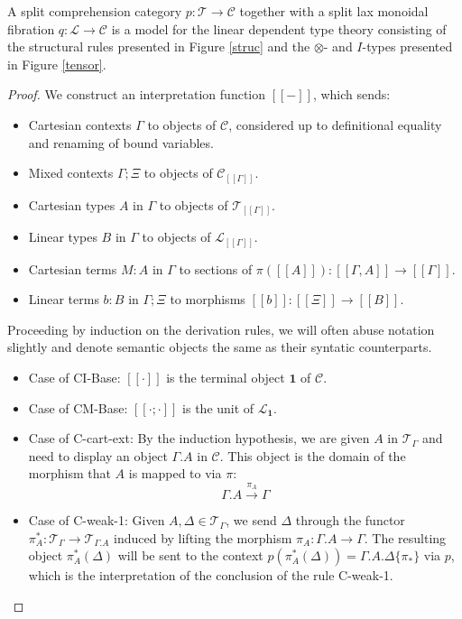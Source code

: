 \begin{thm}[Soundness]
A split comprehension category $p : \mathcal{T} \to \mathcal{C}$ together with a split lax monoidal fibration $q : \mathcal{L} \to \mathcal{C}$ is a model for the linear dependent type theory consisting of the structural rules presented in Figure \ref{struc} and the $\otimes$- and $I$-types presented in Figure \ref{tensor}.
\begin{proof}
  We construct an interpretation function $[[-]]$, which sends:
  \begin{itemize}
  \item Cartesian contexts $\Gamma$ to objects of $\mathcal{C}$, considered up to definitional equality and renaming of bound variables.
  \item Mixed contexts $\Gamma; \Xi$ to objects of $\mathcal{C}_{[[\Gamma]]}$.
  \item Cartesian types $A$ in $\Gamma$ to objects of $\mathcal{T}_{[[\Gamma]]}$.
  \item Linear types $B$ in $\Gamma$ to objects of $\mathcal{L}_{[[\Gamma]]}$.
  \item Cartesian terms $M : A$ in $\Gamma$ to sections of $\pi([[A]]) : [[\Gamma,A]] \to [[\Gamma]]$.
  \item Linear terms $b : B$ in $\Gamma; \Xi$ to morphisms $[[b]] : [[\Xi]] \to [[B]]$.
  \end{itemize}
Proceeding by induction on the derivation rules, we will often abuse notation slightly and denote semantic objects the same as their syntatic counterparts.
\begin{itemize}
\item Case of CI-Base: $[[\cdot]]$ is the terminal object $\mathbf{1}$ of $\mathcal{C}$.
\item Case of CM-Base: $[[\cdot; \cdot]]$ is the unit of $\mathcal{L}_{\mathbf{1}}$.
\item Case of C-cart-ext: By the induction hypothesis, we are given $A$ in $\mathcal{T}_{\Gamma}$ and need to display an object $\Gamma.A$ in $\mathcal{C}$. This object is the domain of the morphism that $A$ is mapped to via $\pi$:
\[\Gamma.A \xrightarrow {\pi_A} \Gamma\]
\item Case of C-weak-1: Given $A, \Delta \in \mathcal{T}_{\Gamma}$, we send $\Delta$ through the functor $\pi_A^* : \mathcal{T}_\Gamma \to \mathcal{T}_{\Gamma.A}$ induced by lifting the morphism $\pi_A : \Gamma.A \to \Gamma$. The resulting object $\pi_A^*(\Delta)$ will be sent to the context $p(\pi_A^*(\Delta)) = \Gamma.A.\Delta\{\pi_*\}$ via $p$, which is the interpretation of the conclusion of the rule C-weak-1.

\end{itemize}
\end{proof}
\end{thm}
